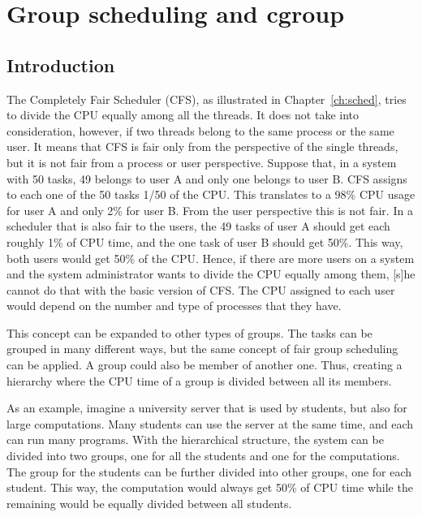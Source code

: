 \chapter{Group scheduling and cgroup} %
\label{ch:cgroup}
\section{Introduction}

The Completely Fair Scheduler (CFS), as illustrated in Chapter~\ref{ch:sched}, tries to divide the CPU equally among all the threads. It does not take into consideration, however, if two threads belong to the same process or the same user. It means that CFS is fair only from the perspective of the single threads, but it is not fair from a process or user perspective. 
Suppose that, in a system with 50 tasks, 49 belongs to user A and only one belongs to user B. CFS assigns to each one of the 50 tasks 1/50 of the CPU. This translates to a 98\% CPU usage for user A and only 2\% for user B. From the user perspective this is not fair.
In a scheduler that is also fair to the users, the 49 tasks of user A should get each roughly 1\% of CPU time, and the one task of user B should get 50\%. This way, both users would get 50\% of the CPU. 
Hence, if there are more users on a system and the system administrator wants to divide the CPU equally among them, [s]he cannot do that with the basic version of CFS. The CPU assigned to each user would depend on the number and type of processes that they have.

This concept can be expanded to other types of groups. The tasks can be grouped in many different ways, but the same concept of fair group scheduling can be applied. A group could also be member of another one. Thus, creating a hierarchy where the CPU time of a group is divided between all its members.

As an example, imagine a university server that is used by students, but also for large computations. Many students can use the server at the same time, and each can run many programs. With the hierarchical structure, the system can be divided into two groups, one for all the students and one for the computations. The group for the students can be further divided into other groups, one for each student. This way, the computation would always get 50\% of CPU time while the remaining would be equally divided between all students.

